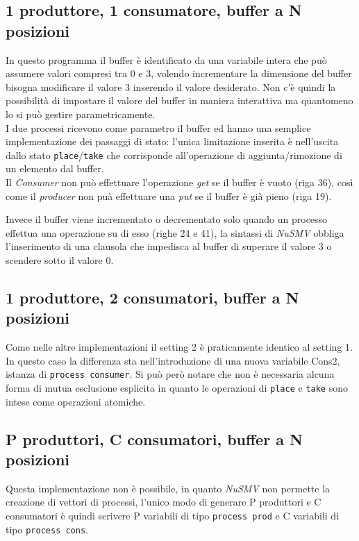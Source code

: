 \documentclass[a4paper]{article}
\begin{document}
\subsection{1 produttore, 1 consumatore, buffer a N posizioni}

In questo programma il buffer è identificato da una variabile intera che può assumere valori compresi tra 0 e 3, volendo incrementare la dimensione del buffer bisogna modificare il valore 3 inserendo il valore desiderato.
Non c'è quindi la possibilità di impostare il valore del buffer in maniera interattiva ma quantomeno lo si può gestire parametricamente.\\
I due processi ricevono come parametro il buffer ed hanno una semplice implementazione dei passaggi di stato: l'unica limitazione inserita è nell'uscita dallo stato \texttt{place}/\texttt{take} che corrisponde all'operazione di aggiunta/rimozione di un elemento dal buffer.\\
Il \textit{Consumer} non può effettuare l'operazione \textit{get} se il buffer è vuoto (riga 36), così come il \textit{producer} non puà effettuare una \textit{put} se il buffer è già pieno (riga 19).

Invece il buffer viene incrementato o decrementato solo quando un processo effettua una operazione su di esso (righe 24 e 41), la sintassi di \textit{NuSMV} obbliga l'inserimento di una clausola che impedisca al buffer di superare il valore 3 o scendere sotto il valore 0.
\newpage
\subsection{1 produttore, 2 consumatori, buffer a N posizioni}

Come nelle altre implementazioni il setting 2 è praticamente identico al setting 1. In questo caso la differenza sta nell'introduzione di una nuova variabile Cons2, istanza di \texttt{process consumer}.
Si può però notare che non è necessaria alcuna forma di mutua esclusione esplicita in quanto le operazioni di \texttt{place} e \texttt{take} sono intese come operazioni atomiche.
\subsection{P produttori, C consumatori, buffer a N posizioni}
Questa implementazione non è possibile, in quanto \emph{NuSMV} non permette la creazione di vettori di processi, l'unico modo di generare P produttori e C consumatori è quindi scrivere P variabili di tipo \texttt{process prod} e C variabili di tipo \texttt{process cons}.
\end{document}
